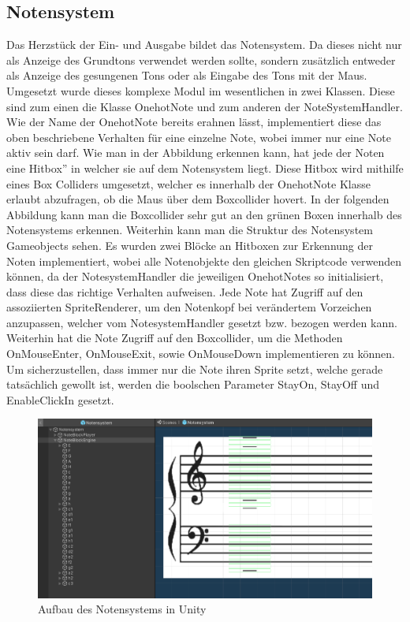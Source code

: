 \subsection*{Notensystem}
\label{sec:notensys}
Das Herzstück der Ein- und Ausgabe bildet das Notensystem. Da dieses nicht nur als Anzeige des Grundtons verwendet werden sollte, sondern zusätzlich entweder als Anzeige des gesungenen Tons oder als Eingabe des Tons mit der Maus. Umgesetzt wurde dieses komplexe Modul im wesentlichen in zwei Klassen. Diese sind zum einen die Klasse OnehotNote und zum anderen der NoteSystemHandler. Wie der Name der OnehotNote bereits erahnen lässt, implementiert diese das oben beschriebene Verhalten für eine einzelne Note, wobei immer nur eine Note aktiv sein darf. Wie man in der Abbildung erkennen kann, hat jede der Noten eine \glqq Hitbox'' in welcher sie auf dem Notensystem liegt. Diese Hitbox wird mithilfe eines Box Colliders umgesetzt, welcher es innerhalb der OnehotNote Klasse erlaubt abzufragen, ob die Maus über dem Boxcollider hovert. In der folgenden Abbildung kann man die Boxcollider sehr gut an den grünen Boxen innerhalb des Notensystems erkennen. Weiterhin kann man die Struktur des Notensystem Gameobjects sehen. Es wurden zwei Blöcke an Hitboxen zur Erkennung der Noten implementiert, wobei alle Notenobjekte den gleichen Skriptcode verwenden können, da der NotesystemHandler die jeweiligen OnehotNotes so initialisiert, dass diese das richtige Verhalten aufweisen. Jede Note hat Zugriff auf den assoziierten SpriteRenderer, um den Notenkopf bei verändertem Vorzeichen anzupassen, welcher vom NotesystemHandler gesetzt bzw. bezogen werden kann. Weiterhin hat die Note Zugriff auf den Boxcollider, um die Methoden OnMouseEnter, OnMouseExit, sowie OnMouseDown implementieren zu können. Um sicherzustellen, dass immer nur die Note ihren Sprite setzt, welche gerade tatsächlich gewollt ist, werden die boolschen Parameter StayOn, StayOff und EnableClickIn gesetzt. 

\begin{figure}[H]
    \centering
    \includegraphics[width=1\textwidth]{Bilder/notensystem.png}
    \caption{Aufbau des Notensystems in Unity}
    \label{sec:hps_algo}
\end{figure}

